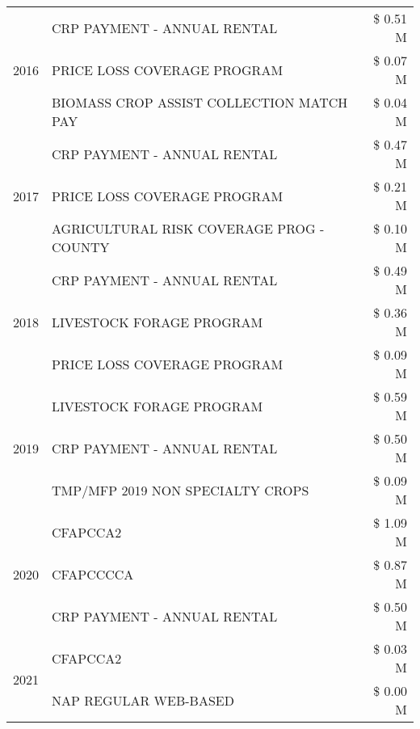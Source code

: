 \begin{tabular}{llr}
\cline{1-3}
\multirow[t]{3}{*}{2016} & CRP PAYMENT - ANNUAL RENTAL                   & \$ 0.51 M \\
 & PRICE LOSS COVERAGE PROGRAM                   & \$ 0.07 M \\
 & BIOMASS CROP ASSIST COLLECTION MATCH PAY      & \$ 0.04 M \\
\cline{1-3}
\multirow[t]{3}{*}{2017} & CRP PAYMENT - ANNUAL RENTAL & \$ 0.47 M \\
 & PRICE LOSS COVERAGE PROGRAM & \$ 0.21 M \\
 & AGRICULTURAL RISK COVERAGE PROG - COUNTY & \$ 0.10 M \\
\cline{1-3}
\multirow[t]{3}{*}{2018} & CRP PAYMENT - ANNUAL RENTAL & \$ 0.49 M \\
 & LIVESTOCK FORAGE PROGRAM & \$ 0.36 M \\
 & PRICE LOSS COVERAGE PROGRAM & \$ 0.09 M \\
\cline{1-3}
\multirow[t]{3}{*}{2019} & LIVESTOCK FORAGE PROGRAM & \$ 0.59 M \\
 & CRP PAYMENT - ANNUAL RENTAL & \$ 0.50 M \\
 & TMP/MFP 2019 NON SPECIALTY CROPS & \$ 0.09 M \\
\cline{1-3}
\multirow[t]{3}{*}{2020} & CFAPCCA2 & \$ 1.09 M \\
 & CFAPCCCCA & \$ 0.87 M \\
 & CRP PAYMENT - ANNUAL RENTAL & \$ 0.50 M \\
\cline{1-3}
\multirow[t]{2}{*}{2021} & CFAPCCA2 & \$ 0.03 M \\
 & NAP REGULAR WEB-BASED & \$ 0.00 M \\
\cline{1-3}
\bottomrule
\end{tabular}
